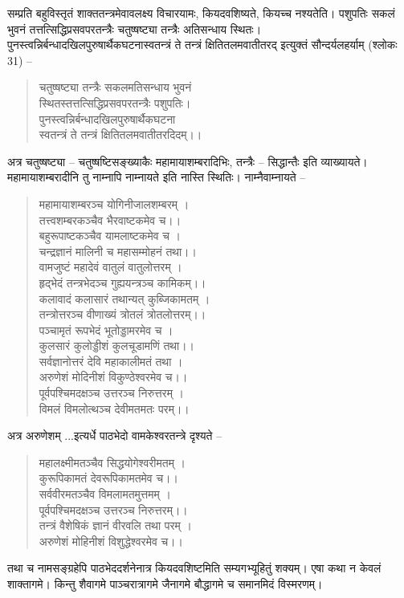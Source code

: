 सम्प्रति बहुविस्तृतं शाक्ततन्त्रमेवावलक्ष्य विचारयामः, कियदवशिष्यते, कियच्च नश्यतेति। पशुपतिः सकलं भुवनं तत्तत्सिद्धिप्रसवपरतन्त्रैः चतुष्षष्ट्या तन्त्रैः अतिसन्धाय स्थितः। पुनस्त्वन्निर्बन्धादखिलपुरुषार्थैकघटनास्वतन्त्रं ते तन्त्रं क्षितितलमवातीतरद् इत्युक्तं सौन्दर्यलहर्याम् (श्लोकः 31) –
\begin{verse}
चतुष्षष्ट्या तन्त्रैः सकलमतिसन्धाय भुवनं \\
स्थितस्तत्तत्सिद्धिप्रसवपरतन्त्रैः पशुपतिः।\\
पुनस्त्वन्निर्बन्धादखिलपुरुषार्थैकघटना \\
स्वतन्त्रं ते तन्त्रं क्षितितलमवातीतरदिदम्।।
\end{verse}
अत्र चतुष्षष्ट्या – चतुष्षष्टिसङ्ख्याकैः महामायाशम्बरादिभिः, तन्त्रैः – सिद्धान्तैः इति व्याख्यायते। महामायाशम्बरादीनि तु नाम्नापि नाम्नायते इति नास्ति स्थितिः। नाम्नैवाम्नायते –
\begin{verse}
महामायाशम्बरञ्च योगिनीजालशम्बरम् । \\
तत्त्वशम्बरकञ्चैव भैरवाष्टकमेव च।।\\
बहुरूपाष्टकञ्चैव यामलाष्टकमेव च । \\
चन्द्रज्ञानं मालिनी च महासम्मोहनं तथा।।\\
वामजुष्टं महादेवं वातुलं वातुलोत्तरम् ।\\
हृद्भेदं तन्त्रभेदञ्च गुह्ययन्त्रञ्च कामिकम्।।\\
कलावादं कलासारं तथान्यत् कुब्जिकामतम् ।\\
तन्त्रोत्तरञ्च वीणाख्यं त्रोतलं त्रोतलोत्तरम्।।\\
पञ्चामृतं रूपभेदं भूतोड्डामरमेव च । \\
कुलसारं कुलोड्डीशं कुलचूडामणिं तथा।।\\
सर्वज्ञानोत्तरं देवि महाकालीमतं तथा । \\
अरुणेशं मोदिनीशं विकुण्ठेश्वरमेव च।।\\
पूर्वपश्चिमदक्षञ्च उत्तरञ्च निरुत्तरम् । \\
विमलं विमलोत्थञ्च देवीमतमतः परम्।।
\end{verse}
अत्र अरुणेशम् ...इत्यर्धे पाठभेदो वामकेश्वरतन्त्रे दृश्यते –
\begin{verse}
महालक्ष्मीमतञ्चैव सिद्धयोगेश्वरीमतम् । \\
कुरूपिकामतं देवरूपिकामतमेव च।।\\
सर्ववीरमतञ्चैव विमलामतमुत्तमम् ।\\
पूर्वपश्चिमदक्षञ्च उत्तरञ्च निरुत्तरम्।।\\
तन्त्रं वैशेषिकं ज्ञानं वीरवलि तथा परम् ।\\ 
अरुणेशं मोहिनीशं विशुद्धेश्वरमेव च।।
\end{verse}
तथा च नामसङ्ग्रहेपि पाठभेददर्शनेनात्र कियदवशिष्टमिति सम्यगभ्यूहितुं शक्यम्। एषा कथा न केवलं शाक्तागमे। किन्तु शैवागमे पाञ्चरात्रागमे जैनागमे बौद्धागमे च समानमिदं विस्मरणम्।

